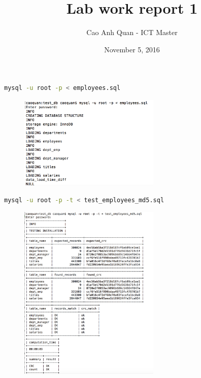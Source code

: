 \documentclass[12pt, letterpaper, twoside]{article}
\title{Lab work report 1}
\author{Cao Anh Quan - ICT Master}
\date{November 5, 2016}
\begin{document}
 
\begin{titlepage}
\maketitle
\end{titlepage}

\begin{lstlisting}[language=Bash]
mysql -u root -p < employees.sql 
\end{lstlisting}

\begin{figure}[h]
\centerline{\includegraphics[width=0.6\textwidth]{img2.jpg}}
\end{figure}

\begin{lstlisting}[language=Bash]
mysql -u root -p -t < test_employees_md5.sql
\end{lstlisting}


\begin{figure}[h]
\centerline{\includegraphics[width=0.6\textwidth]{img1.jpg}}
\end{figure}

 
\end{document}
